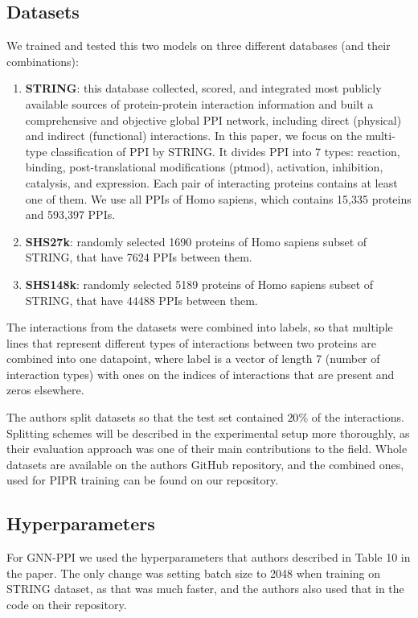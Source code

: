 \subsection{Datasets}
We trained and tested this two models on three different databases (and their combinations):

\begin{enumerate}
    \item \textbf{STRING}: this database collected, scored, and integrated most
    publicly available sources of protein-protein interaction information and built a comprehensive and objective global PPI network, including direct (physical) and indirect (functional)
    interactions. In this paper, we focus on the multi-type classification of PPI by STRING. It divides PPI into 7 types: reaction, binding, post-translational modifications (ptmod),
    activation, inhibition, catalysis, and expression. Each pair of
    interacting proteins contains at least one of them. We use all PPIs of Homo sapiens, which contains 15,335 proteins and 593,397 PPIs. 
    \item \textbf{SHS27k}: randomly selected 1690 proteins of Homo sapiens subset of STRING, that have 7624 PPIs between them.
    \item \textbf{SHS148k}: randomly selected 5189 proteins of Homo sapiens subset of STRING, that have 44488 PPIs between them.
    
\end{enumerate}

The interactions from the datasets were combined into labels, so that multiple lines that represent different types of interactions between two proteins are combined into one datapoint, where label is a vector of length 7 (number of interaction types) with ones on the indices of interactions that are present and zeros elsewhere. 

The authors split datasets so that the test set contained $20 \%$ of the interactions. Splitting schemes will be described in the experimental setup more thoroughly, as their evaluation approach was one of their main contributions to the field. Whole datasets are available on the authors GitHub repository, and the combined ones, used for PIPR training can be found on our repository.

%
\subsection{Hyperparameters}
For GNN-PPI we used the hyperparameters that authors described in Table 10 in the paper. The only change was setting batch size to 2048 when training on STRING dataset, as that was much faster, and the authors also used that in the code on their repository.

